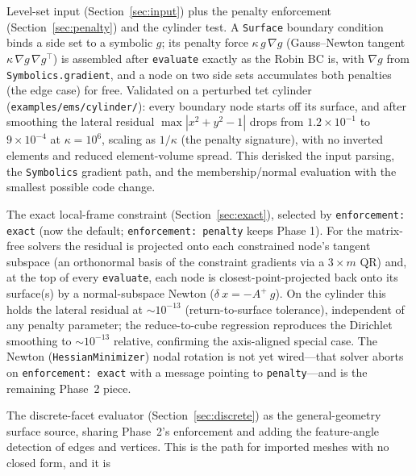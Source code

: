 \documentclass[11pt]{article}
\newcommand{\grad}{\nabla}
\newcommand{\code}[1]{\texttt{#1}}
\begin{document}
\begin{description}[style=unboxed,leftmargin=0pt,itemsep=2pt]
  \item[Phase 1 \emph{(implemented)}.] Level-set input
  (Section~\ref{sec:input}) plus the penalty enforcement
  (Section~\ref{sec:penalty}) and the cylinder test. A \code{Surface} boundary
  condition binds a side set to a symbolic $g$; its penalty force $\kappa\,g\,
  \grad g$ (Gauss--Newton tangent $\kappa\,\grad g\,\grad g^{\top}$) is assembled
  after \code{evaluate} exactly as the Robin BC is, with $\grad g$ from
  \code{Symbolics.gradient}, and a node on two side sets accumulates both
  penalties (the edge case) for free. Validated on a perturbed tet cylinder
  (\code{examples/\allowbreak ems/\allowbreak cylinder/}): every boundary node
  starts off its surface, and after smoothing the lateral residual
  $\max|x^2+y^2-1|$ drops from $1.2\times10^{-1}$ to $9\times10^{-4}$ at
  $\kappa=10^6$, scaling as $1/\kappa$ (the penalty signature), with no inverted
  elements and reduced element-volume spread. This derisked the input parsing,
  the \code{Symbolics} gradient path, and the membership/normal evaluation with
  the smallest possible code change.
  \item[Phase 2 \emph{(matrix-free implemented)}.] The exact local-frame
  constraint (Section~\ref{sec:exact}), selected by \code{enforcement: exact}
  (now the default; \code{enforcement: penalty} keeps Phase 1). For the
  matrix-free solvers the residual is projected onto each constrained node's
  tangent subspace (an orthonormal basis of the constraint gradients via a $3
  \times m$ QR) and, at the top of every \code{evaluate}, each node is
  closest-point-projected back onto its surface(s) by a normal-subspace Newton
  ($\delta~x = -A^{+}~g$). On the cylinder this holds the lateral residual at
  $\sim\!10^{-13}$ (return-to-surface tolerance), independent of any penalty
  parameter; the reduce-to-cube regression reproduces the Dirichlet smoothing to
  $\sim\!10^{-13}$ relative, confirming the axis-aligned special case. The Newton
  (\code{HessianMinimizer}) nodal rotation is not yet wired---that solver aborts
  on \code{enforcement: exact} with a message pointing to \code{penalty}---and is
  the remaining Phase~2 piece.
  \item[Phase 3.] The discrete-facet evaluator
  (Section~\ref{sec:discrete}) as the general-geometry surface source, sharing
  Phase~2's enforcement and adding the feature-angle detection of edges and
  vertices. This is the path for imported meshes with no closed form, and it is

\end{description}
\end{document}
